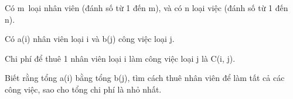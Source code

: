 Có m loại nhân viên (đánh số từ 1 đến m), và có n loại việc (đánh số từ 1 đến n).

Có a(i) nhân viên loại i và b(j) công việc loại j.

Chi phí để thuê 1 nhân viên loại i làm công việc loại j là C(i, j).

Biết rằng tổng a(i) bằng tổng b(j), tìm cách thuê nhân viên để làm tất cả các công việc, sao cho tổng chi phí là nhỏ nhất.

\